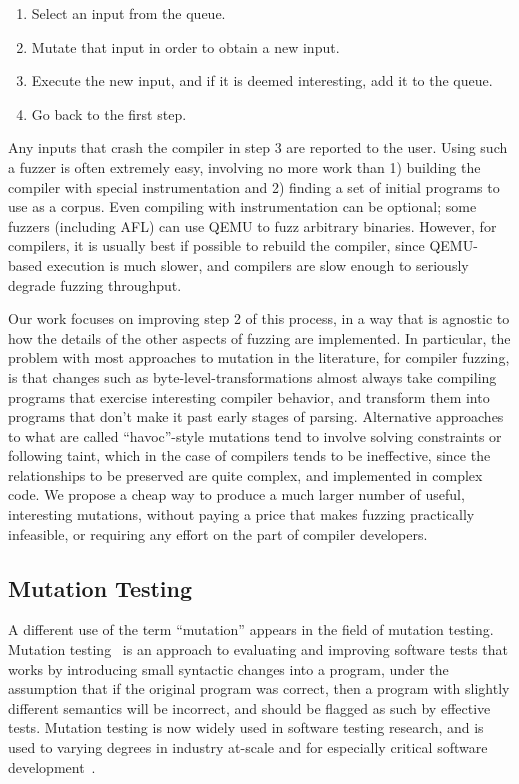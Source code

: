 \begin{enumerate}
\item Select an input from the queue.
\item Mutate that input in order to obtain a new input.
\item Execute the new input, and if it is deemed interesting, add it to the queue.
\item Go back to the first step.
\end{enumerate}

Any inputs that crash the compiler in step 3 are reported to the user.  Using such a fuzzer is often extremely easy, involving no more work than 1) building the compiler with special instrumentation and 2) finding a set of initial programs to use as a corpus.  Even compiling with instrumentation can be optional; some fuzzers (including AFL) can use QEMU to fuzz arbitrary binaries.  However, for compilers, it is usually best if possible to rebuild the compiler, since QEMU-based execution is much slower, and compilers are slow enough to seriously degrade fuzzing throughput.


Our work focuses on improving step 2 of this process, in a way that is agnostic to how the details of the other aspects of fuzzing are implemented.  In particular, the problem with most approaches to mutation in the literature, for compiler fuzzing, is that changes such as byte-level-transformations almost always take compiling programs that exercise interesting compiler behavior, and transform them into programs that don't make it past early stages of parsing.  Alternative approaches to what are called ``havoc''-style mutations tend to involve solving constraints or following taint, which in the case of compilers tends to be ineffective, since the relationships to be preserved are quite complex, and implemented in complex code.  We propose a cheap way to produce a much larger number of useful, interesting mutations, without paying a price that makes fuzzing practically infeasible, or requiring any effort on the part of compiler developers.

\subsection{Mutation Testing}

A different use of the term ``mutation'' appears in the field of mutation testing.  Mutation testing~\cite{MutationSurvey,budd1979mutation,demillo1978hints} is an approach to evaluating and improving software tests that works by introducing small syntactic changes into a program, under the assumption that if the original program was correct, then a program with slightly different semantics will be incorrect, and should be flagged as such by effective tests.  Mutation testing is now widely used in software testing research, and is used to varying degrees in industry at-scale and for especially critical software development~\cite{mutKernel,mutGoogle,mutFacebook}.

